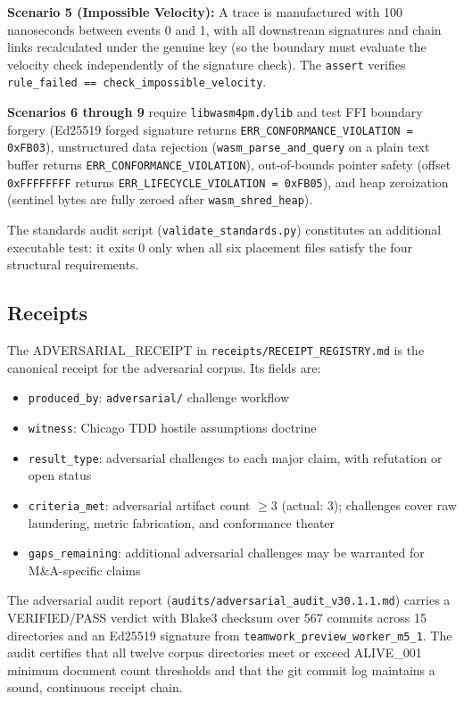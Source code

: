\textbf{Scenario 5 (Impossible Velocity):} A trace is manufactured with 100 nanoseconds
between events 0 and 1, with all downstream signatures and chain links recalculated under the
genuine key (so the boundary must evaluate the velocity check independently of the signature
check). The \texttt{assert} verifies \texttt{rule\_failed == check\_impossible\_velocity}.

\textbf{Scenarios 6 through 9} require \texttt{libwasm4pm.dylib} and test FFI boundary
forgery (Ed25519 forged signature returns \texttt{ERR\_CONFORMANCE\_VIOLATION = 0xFB03}),
unstructured data rejection (\texttt{wasm\_parse\_and\_query} on a plain text buffer returns
\texttt{ERR\_CONFORMANCE\_VIOLATION}), out-of-bounds pointer safety (offset
\texttt{0xFFFFFFFF} returns \texttt{ERR\_LIFECYCLE\_VIOLATION = 0xFB05}), and heap
zeroization (sentinel bytes are fully zeroed after \texttt{wasm\_shred\_heap}).

The standards audit script (\texttt{validate\_standards.py}) constitutes an additional
executable test: it exits 0 only when all six placement files satisfy the four structural
requirements.

\subsection{Receipts}
\label{sec:adversarial-evidence-receipts}

The ADVERSARIAL\_RECEIPT in \texttt{receipts/RECEIPT\_REGISTRY.md} is the canonical receipt
for the adversarial corpus. Its fields are:
\begin{itemize}
  \item \texttt{produced\_by}: \texttt{adversarial/} challenge workflow
  \item \texttt{witness}: Chicago TDD hostile assumptions doctrine
  \item \texttt{result\_type}: adversarial challenges to each major claim, with refutation or
        open status
  \item \texttt{criteria\_met}: adversarial artifact count $\geq 3$ (actual: 3); challenges
        cover raw laundering, metric fabrication, and conformance theater
  \item \texttt{gaps\_remaining}: additional adversarial challenges may be warranted for
        M\&A-specific claims
\end{itemize}

The adversarial audit report (\texttt{audits/adversarial\_audit\_v30.1.1.md}) carries a
VERIFIED/PASS verdict with Blake3 checksum over 567 commits across 15 directories and an
Ed25519 signature from \texttt{teamwork\_preview\_worker\_m5\_1}. The audit certifies that
all twelve corpus directories meet or exceed ALIVE\_001 minimum document count thresholds
and that the git commit log maintains a sound, continuous receipt chain.

